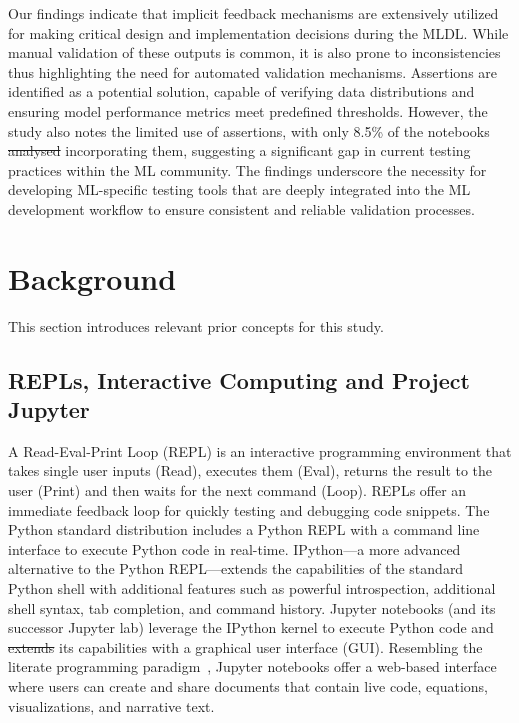 \documentclass[smallextended]{svjour3}       %
\providecommand{\DIFadd}[1]{{\protect\color{blue}\uwave{#1}}} %
\providecommand{\DIFdel}[1]{{\protect\color{red}\sout{#1}}} %
\providecommand{\DIFaddbegin}{} %
\providecommand{\DIFaddend}{} %
\providecommand{\DIFdelbegin}{} %
\providecommand{\DIFdelend}{} %
\newcommand{\DIFscaledelfig}{0.5}
\newlength{\DIFdelgraphicswidth} %
\newlength{\DIFdelgraphicsheight} %
\newcommand{\DIFaddincludegraphics}[2][]{{\color{blue}\fbox{\DIFOincludegraphics[#1]{#2}}}} %
\newcommand{\DIFdelincludegraphics}[2][]{%
\sbox{\DIFdelgraphicsbox}{\DIFOincludegraphics[#1]{#2}}%
\settoboxwidth{\DIFdelgraphicswidth}{\DIFdelgraphicsbox} %
\settoboxtotalheight{\DIFdelgraphicsheight}{\DIFdelgraphicsbox} %
\scalebox{\DIFscaledelfig}{%
\parbox[b]{\DIFdelgraphicswidth}{\usebox{\DIFdelgraphicsbox}\\[-\baselineskip] \rule{\DIFdelgraphicswidth}{0em}}\llap{\resizebox{\DIFdelgraphicswidth}{\DIFdelgraphicsheight}{%
\setlength{\unitlength}{\DIFdelgraphicswidth}%
\begin{picture}(1,1)%
\thicklines\linethickness{2pt} %
{\color[rgb]{1,0,0}\put(0,0){\framebox(1,1){}}}%
{\color[rgb]{1,0,0}\put(0,0){\line( 1,1){1}}}%
{\color[rgb]{1,0,0}\put(0,1){\line(1,-1){1}}}%
\end{picture}%
}\hspace*{3pt}}} %
} %
\DeclareRobustCommand{\DIFaddbegin}{\DIFOaddbegin \let\includegraphics\DIFaddincludegraphics} %
\DeclareRobustCommand{\DIFaddend}{\DIFOaddend \let\includegraphics\DIFOincludegraphics} %
\DeclareRobustCommand{\DIFdelbegin}{\DIFOdelbegin \let\includegraphics\DIFdelincludegraphics} %
\DeclareRobustCommand{\DIFdelend}{\DIFOaddend \let\includegraphics\DIFOincludegraphics} %
\begin{document}
Our findings indicate that implicit feedback mechanisms are extensively utilized for making critical design and implementation decisions during the MLDL. While manual validation of these outputs is common, it is also prone to inconsistencies thus highlighting the need for automated validation mechanisms. Assertions are identified as a potential solution, capable of verifying data distributions and ensuring model performance metrics meet predefined thresholds. However, the study also notes the limited use of assertions, with only 8.5\% of the notebooks \DIFdelbegin \DIFdel{analysed }\DIFdelend \DIFaddbegin \DIFadd{analyzed }\DIFaddend incorporating them, suggesting a significant gap in current testing practices within the ML community. The findings underscore the necessity for developing ML-specific testing tools that are deeply integrated into the ML development workflow to ensure consistent and reliable validation processes.

\section{Background}\label{sec:background}

This section introduces relevant prior concepts for this study.

\subsection{REPLs, Interactive Computing and Project Jupyter}

A Read-Eval-Print Loop (REPL) is an interactive programming environment that takes single user inputs (Read), executes them (Eval), returns the result to the user (Print) and then waits for the next command (Loop). REPLs offer an immediate feedback loop for quickly testing and debugging code snippets. The Python standard distribution includes a Python REPL with a command line interface to execute Python code in real-time. IPython---a more advanced alternative to the Python REPL---extends the capabilities of the standard Python shell with additional features such as powerful introspection, additional shell syntax, tab completion, and command history. Jupyter notebooks (and its successor Jupyter lab) leverage the IPython kernel to execute Python code and \DIFdelbegin \DIFdel{extends }\DIFdelend \DIFaddbegin \DIFadd{extend }\DIFaddend its capabilities with a graphical user interface (GUI). Resembling the literate programming paradigm~\citep{knuth1984literate}, Jupyter notebooks offer a web-based interface where users can create and share documents that contain live code, equations, visualizations, and narrative text.
\end{document}
